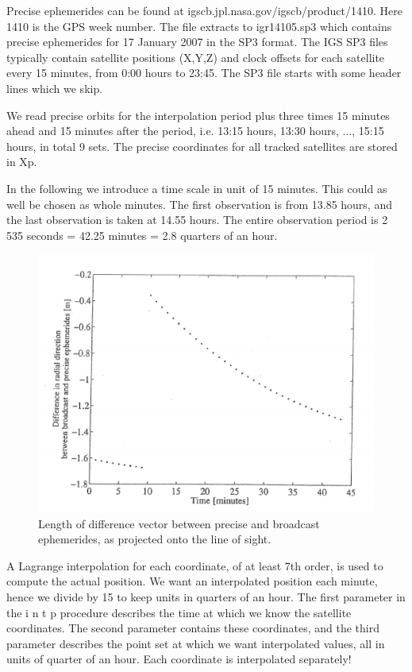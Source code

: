 		Precise ephemerides can be found at igscb.jpl.nasa.gov/igscb/product/1410. Here 1410 is the GPS week number. The file extracts to igr14105.sp3 which contains precise ephemerides for 17 January 2007 in the SP3 format. The IGS SP3 files typically contain satellite positions (X,Y,Z) and clock offsets for each satellite every 15 minutes, from 0:00 hours to 23:45. The SP3 file starts with some header lines which we skip.
		
		We read precise orbits for the interpolation period plus three times 15 minutes ahead and 15 minutes after the period, i.e. 13:15 hours, 13:30 hours, ..., 15:15 hours, in total 9 sets. The precise coordinates for all tracked satellites are stored in Xp.
		
		In the following we introduce a time scale in unit of 15 minutes. This could as well be chosen as whole minutes. The first observation is from 13.85 hours, and the last observation is taken at 14.55 hours. The entire observation period is 2 535 seconds = 42.25 minutes = 2.8 quarters of an hour.
		\begin{figure}
			\centering
			\includegraphics[width=0.7\linewidth]{TeX_files/Part03/chapter09/image/9-18}
			\caption{Length of difference vector between precise and broadcast ephemerides, as projected onto the line of sight.}
			\label{fig:9-18}
		\end{figure}
		
		A Lagrange interpolation for each coordinate, of at least 7th order, is used to compute the actual position. We want an interpolated position each minute, hence we divide by 15 to keep units in quarters of an hour. The first parameter in the i n t p procedure describes the time at which we know the satellite coordinates. The second parameter contains these coordinates, and the third parameter describes the point set at which we want interpolated values, all in units of quarter of an hour. Each coordinate is interpolated separately!
		
